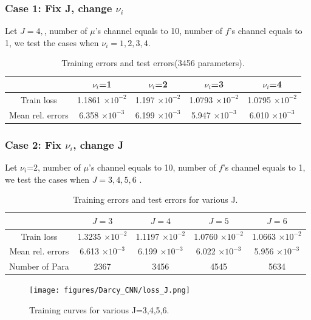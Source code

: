 \subsubsection{Case 1: Fix J, change $\nu_i$}
Let $J=4,$, number of $\mu$'s channel equals to 10, number of $f$'s channel equals to 1, we test the cases when $\nu_i=1,2,3,4$.
\begin{table}
	\begin{center}
		\begin{tabular}{|c|c|c|c|c|}
			\hline
			& $\nu_i$=1 & $\nu_i$=2 & $\nu_i$=3& $\nu_i$=4 \\
			\hline
			Train loss & 1.1861 $\times 10^{-2}$ & 1.197 $\times 10^{-2}$& 1.0793 $\times 10^{-2}$ & 1.0795 $\times 10^{-2}$\\
			\hline
			Mean rel. errors & 6.358 $\times 10^{-3}$ &6.199 $\times 10^{-3}$ &5.947 $\times 10^{-3}$ &6.010 $\times 10^{-3}$ \\
			\hline
		\end{tabular}\caption{Training errors and test errors(3456 parameters).}
	\end{center}
\end{table}

\subsubsection{Case 2: Fix $\nu_i$, change J}
Let $\nu_i$=2, number of $\mu$'s channel equals to 10, number of $f$'s channel equals to 1, we test the cases when $J=3,4,5,6$
.\begin{table}
	\begin{center}
		\begin{tabular}{|c|c|c|c|c|}
			\hline
			& $J=3$ & $J=4$ & $J=5$& $J=6$ \\
			\hline
			Train loss & 1.3235 $\times 10^{-2}$ & 1.1197 $\times 10^{-2}$& 1.0760 $\times 10^{-2}$ & 1.0663 $\times 10^{-2}$\\
			\hline
			Mean rel. errors & 6.613 $\times 10^{-3}$ &6.199 $\times 10^{-3}$ &6.022 $\times 10^{-3}$ &5.956 $\times 10^{-3}$ \\
			\hline
			Number of Para & 2367& 3456& 4545 & 5634\\
			\hline
		\end{tabular}\caption{Training errors and test errors for various J.}
	\end{center}
\end{table}
\begin{figure}[H]
	\centering
	\texttt{[image: figures/Darcy\_CNN/loss\_J.png]}
	\caption{Training curves for various J=3,4,5,6.}
\end{figure}
